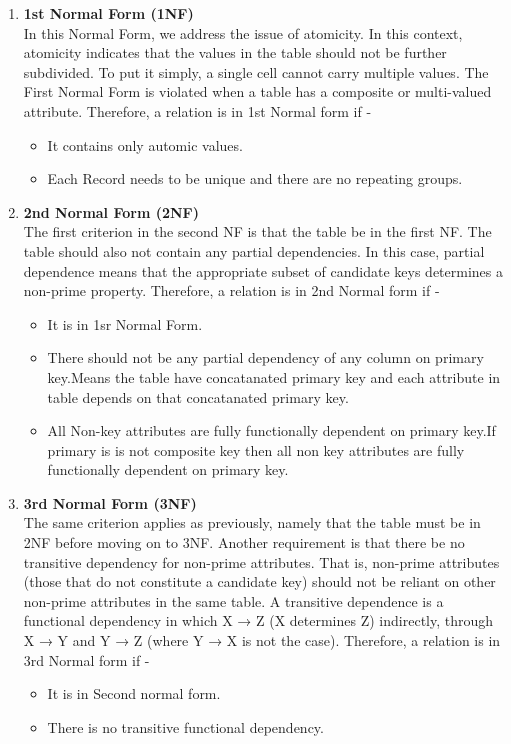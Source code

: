 \begin{enumerate}
\item \textbf{1st Normal Form (1NF)}\\
In this Normal Form, we address the issue of atomicity. In this context, atomicity indicates that the values in the table should not be further subdivided. To put it simply, a single cell cannot carry multiple values. The First Normal Form is violated when a table has a composite or multi-valued attribute. Therefore, a relation is in 1st Normal form if -
\begin{itemize}
\item It contains only automic values.
\item Each Record needs to be unique and there are no repeating groups.
\end{itemize}

\item \textbf{2nd Normal Form (2NF)}\\
The first criterion in the second NF is that the table be in the first NF. The table should also not contain any partial dependencies. In this case, partial dependence means that the appropriate subset of candidate keys determines a non-prime property. Therefore, a relation is in 2nd Normal form if -
\begin{itemize}
\item It is in 1sr Normal Form.
\item There should not be any partial dependency of any column on primary key.Means the table have concatanated primary key and each attribute in table depends on that concatanated primary key.
\item All Non-key attributes are fully functionally dependent on primary key.If primary is is not composite key then all non key attributes are fully functionally dependent on primary key.
\end{itemize}

\item \textbf{3rd Normal Form (3NF)}\\
The same criterion applies as previously, namely that the table must be in 2NF before moving on to 3NF. Another requirement is that there be no transitive dependency for non-prime attributes. That is, non-prime attributes (those that do not constitute a candidate key) should not be reliant on other non-prime attributes in the same table. A transitive dependence is a functional dependency in which X → Z (X determines Z) indirectly, through X → Y and Y → Z (where Y → X is not the case). Therefore, a relation is in 3rd Normal form if -
\begin{itemize}
\item It is in Second normal form.
\item There is no transitive functional dependency.
\end{itemize}


\end{enumerate}
